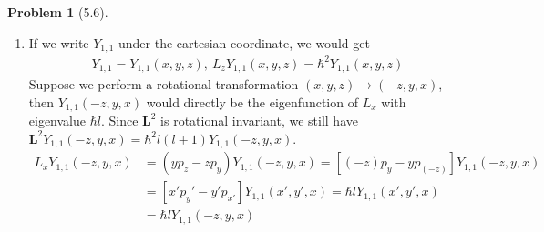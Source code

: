 \documentclass[twoside,11pt]{article}
\theoremstyle{definition}
\newtheorem{problem}{Problem}
\theoremstyle{remark}
\begin{document}
\begin{problem}[5.6]\
    \begin{enumerate}[label=(\alph*)]
        \item If we write $Y_{1,1}$ under the cartesian coordinate, we would get
        \begin{align*}
            Y_{1,1} = Y_{1,1}(x,y,z),\
            L_z Y_{1, 1}(x, y, z) = \hbar^2 Y_{1, 1}(x, y, z)
        \end{align*}
        Suppose we perform a rotational transformation $(x, y, z)\rightarrow(-z, y, x)$, 
        then $Y_{1, 1}(-z, y, x)$ would directly be the eigenfunction of $L_x$ with eigenvalue
        $\hbar l$.
        Since $\mathbf{L}^2$ is rotational invariant, we still have $\mathbf{L}^2Y_{1,1}(-z, y, x) =\hbar^2l(l+1)
        Y_{1,1}(-z, y, x)$.
        \begin{align*}
            L_xY_{1, 1}(-z, y, x) 
            &= (yp_z - zp_y) Y_{1,1}(-z, y, x)
            = [(-z)p_y - yp_{(-z)}] Y_{1,1}(-z,y,x)\\
            &= [x'p_y'  - y' p_{x'}] Y_{1,1}(x',y',x)
            = \hbar l Y_{1,1}(x', y', x)\\
            &= \hbar  l Y_{1,1}(-z, y, x)
        \end{align*}
        

\end{enumerate}
\end{problem}
\end{document}
